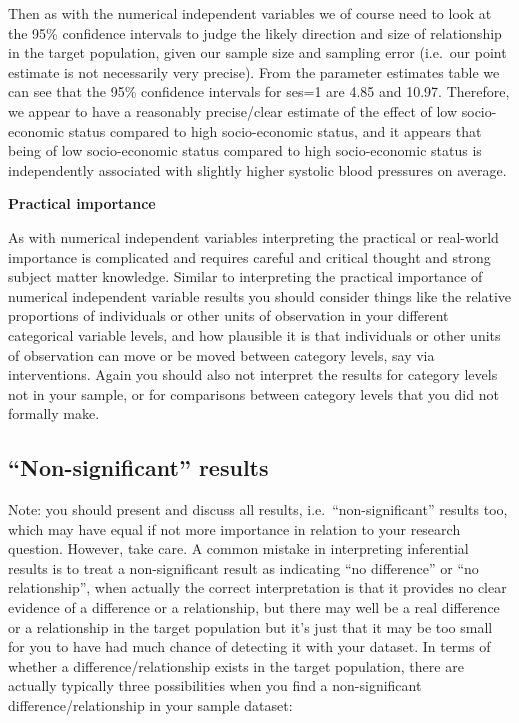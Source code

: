 \documentclass[
]{book}
\begin{document}
Then as with the numerical independent variables we of course need to look at the 95\% confidence intervals to judge the likely direction and size of relationship in the target population, given our sample size and sampling error (i.e.~our point estimate is not necessarily very precise). From the parameter estimates table we can see that the 95\% confidence intervals for ses=1 are 4.85 and 10.97. Therefore, we appear to have a reasonably precise/clear estimate of the effect of low socio-economic status compared to high socio-economic status, and it appears that being of low socio-economic status compared to high socio-economic status is independently associated with slightly higher systolic blood pressures on average.

\textbf{Practical importance}

As with numerical independent variables interpreting the practical or real-world importance is complicated and requires careful and critical thought and strong subject matter knowledge. Similar to interpreting the practical importance of numerical independent variable results you should consider things like the relative proportions of individuals or other units of observation in your different categorical variable levels, and how plausible it is that individuals or other units of observation can move or be moved between category levels, say via interventions. Again you should also not interpret the results for category levels not in your sample, or for comparisons between category levels that you did not formally make.

\hypertarget{non-significant-results}{%
\subsection{``Non-significant'' results}\label{non-significant-results}}

Note: you should present and discuss all results, i.e.~``non-significant'' results too, which may have equal if not more importance in relation to your research question. However, take care. A common mistake in interpreting inferential results is to treat a non-significant result as indicating ``no difference'' or ``no relationship'', when actually the correct interpretation is that it provides no clear evidence of a difference or a relationship, but there may well be a real difference or a relationship in the target population but it's just that it may be too small for you to have had much chance of detecting it with your dataset. In terms of whether a difference/relationship exists in the target population, there are actually typically three possibilities when you find a non-significant difference/relationship in your sample dataset:
\end{document}
